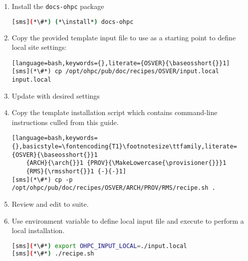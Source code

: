 \begin{enumerate}
\item Install the \texttt{docs-ohpc} package

\begin{lstlisting}[language=bash,keywords={}]
[sms](*\#*) (*\install*) docs-ohpc
\end{lstlisting}

\item Copy the provided template input file to use as a starting point to
  define local site settings:
\begin{lstlisting}[language=bash,keywords={},literate={OSVER}{\baseosshort{}}1]
[sms](*\#*) cp /opt/ohpc/pub/doc/recipes/OSVER/input.local input.local
\end{lstlisting}

\item Update  with desired settings

\item Copy the template installation script which contains command-line
  instructions culled from this guide.

\begin{lstlisting}[language=bash,keywords={},basicstyle=\fontencoding{T1}\footnotesize\ttfamily,literate={OSVER}{\baseosshort{}}1
    {ARCH}{\arch{}}1 {PROV}{\MakeLowercase{\provisioner{}}}1
    {RMS}{\rmsshort{}}1 {-}{-}1]
[sms](*\#*) cp -p /opt/ohpc/pub/doc/recipes/OSVER/ARCH/PROV/RMS/recipe.sh .
\end{lstlisting}

\item Review and edit  to suite.

\item Use environment variable to define local input file and execute
   to perform a local installation.

\begin{lstlisting}[language=bash,keywords={}]
[sms](*\#*) export OHPC_INPUT_LOCAL=./input.local
[sms](*\#*) ./recipe.sh
\end{lstlisting}
\end{enumerate}
